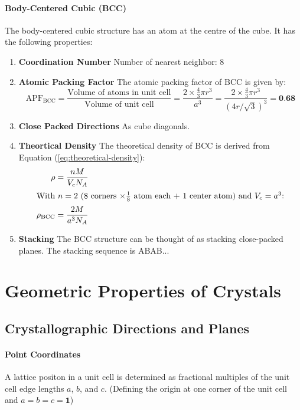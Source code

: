 \documentclass[11pt]{report}
\begin{document}
\paragraph{Body-Centered Cubic (BCC)} The body-centered cubic structure has an atom at the centre of the cube. It has the following properties:
\begin{enumerate}
    \item \textbf{Coordination Number} Number of nearest neighbor: 8
    \item \textbf{Atomic Packing Factor} The atomic packing factor of BCC is given by:
    \begin{equation}
        \text{APF}_\text{BCC} = \frac{\text{Volume of atoms in unit cell}}{\text{Volume of unit cell} } = \frac{2 \times \frac{4}{3}\pi r^3}{a^3} = \frac{2 \times \frac{4}{3}\pi r^3}{(4r/\sqrt{3})^3} = \textbf{0.68}
    \end{equation}
    \item \textbf{Close Packed Directions} As cube diagonals.
    \item \textbf{Theortical Density} The theoretical density of BCC is derived from Equation (\ref{eq:theoretical-density}):
    \begin{align}
        \rho &= \frac{nM}{V_c N_A} \nonumber \\
        \intertext{With $n = 2$ (8 corners $\times \frac{1}{8}$ atom each + 1 center atom) and $V_c = a^3$:}
        \rho_\text{BCC} &= \frac{2M}{a^3 N_A} 
    \end{align}
    \item \textbf{Stacking} The BCC structure can be thought of as stacking close-packed planes. The stacking sequence is ABAB...
\end{enumerate}
\section{Geometric Properties of Crystals}
\subsection{Crystallographic Directions and Planes}
\paragraph{Point Coordinates} A lattice positon in a unit cell is determined as fractional multiples of the unit cell edge lengths $a$, $b$, and $c$. (Defining the origin at one corner of the unit cell and $a=b=c=\textbf{1}$)
\end{document}
